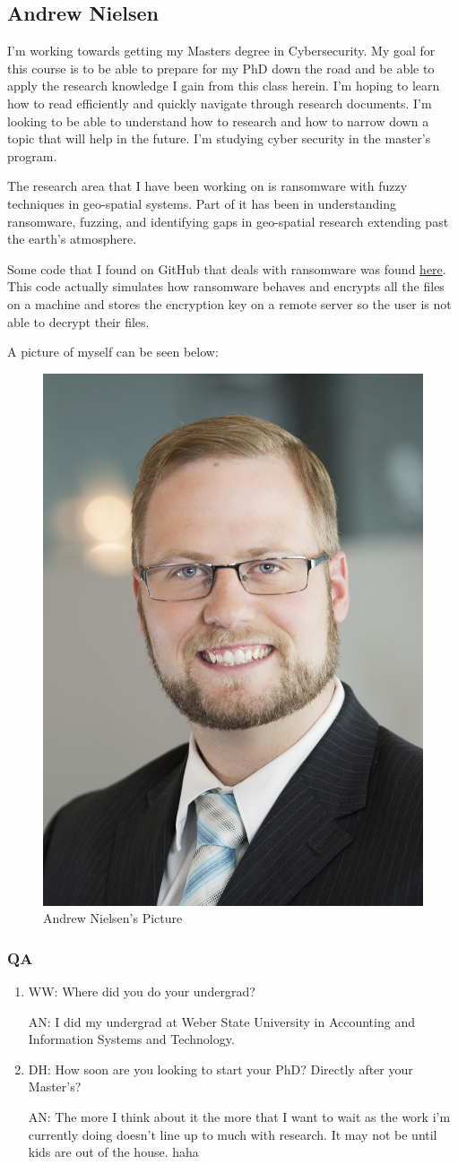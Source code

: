 \subsection{Andrew Nielsen}

I'm working towards getting my Masters degree in Cybersecurity. My goal for this course is to be able to prepare for my PhD down the road and be able to apply the research knowledge I gain from this class herein. I'm hoping to learn how to read efficiently and quickly navigate through research documents. I'm looking to be able to understand how to research and how to narrow down a topic that will help in the future. I'm studying cyber security in the master's program. 

The research area that I have been working on is ransomware with fuzzy techniques in geo-spatial systems. Part of it has been in understanding ransomware, fuzzing, and identifying gaps in geo-spatial research extending past the earth's atmosphere.

Some code that I found on GitHub that deals with ransomware was found \href{https://github.com/mauri870/ransomware.git}{here}. This code actually simulates how ransomware behaves and encrypts all the files on a machine and stores the encryption key on a remote server so the user is not able to decrypt their files. 


A picture of myself can be seen below:

\begin{figure}[htp]\centering
\includegraphics[width=.3\textwidth]{Andrew Professional picture.jpg}
\caption{Andrew Nielsen's Picture}
\label{fig:Andrew Professional picture}
\end{figure}

\subsubsection{QA}

\begin{enumerate}
    \item WW: Where did you do your undergrad?

	AN: I did my undergrad at Weber State University in Accounting and Information Systems and Technology. 

    \item DH: How soon are you looking to start your PhD? Directly after your Master's?

	AN: The more I think about it the more that I want to wait as the work i'm currently doing doesn't line up to much with research. It may not be until kids are out of the house. haha
\end{enumerate}

